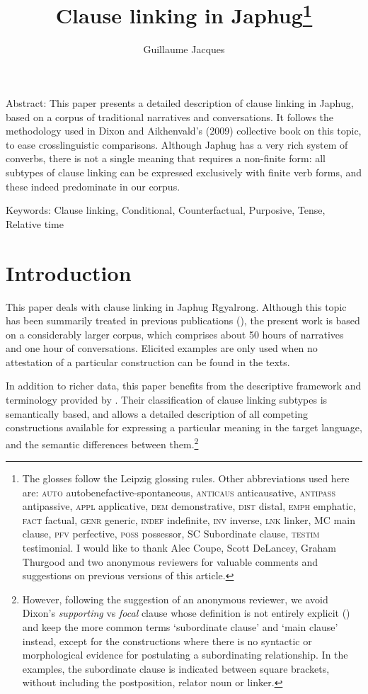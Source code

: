 \documentclass[oldfontcommands,oneside,a4paper,11pt]{article}
\begin{document}
 
\title{Clause linking in Japhug\footnote{
The glosses follow the Leipzig glossing rules. Other abbreviations used here are: \textsc{auto}  autobenefactive-spontaneous, \textsc{anticaus} anticausative, \textsc{antipass} antipassive, \textsc{appl} applicative, \textsc{dem} demonstrative,  \textsc{dist} distal, \textsc{emph} emphatic, \textsc{fact} factual, \textsc{genr} generic, \textsc{indef} indefinite, \textsc{inv} inverse,  \textsc{lnk} linker, MC main clause, \textsc{pfv} perfective, \textsc{poss} possessor,  SC Subordinate clause, \textsc{testim} testimonial. I would like to thank Alec Coupe, Scott DeLancey, Graham Thurgood and two anonymous reviewers for valuable comments and suggestions on previous versions of this article.
} }
\author{Guillaume Jacques}
\maketitle

Abstract: This paper presents a detailed description of clause linking in Japhug, based on a corpus of traditional narratives and conversations. It follows the methodology used in Dixon and Aikhenvald's (2009) collective book on this topic, to ease crosslinguistic comparisons. Although Japhug has a very rich system of converbs, there is not a single meaning that requires a non-finite form: all subtypes of clause linking can be expressed exclusively with finite verb forms, and these indeed predominate in our corpus.

Keywords: Clause linking, Conditional, Counterfactual, Purposive, Tense, Relative time 

\section{Introduction}

This paper  deals with clause linking in Japhug Rgyalrong. Although this topic has been summarily treated in previous publications (\citealt[317-325]{jacques08}), the present work is based on a considerably larger corpus, which comprises about 50 hours of narratives and one hour of conversations. Elicited examples are only used when no attestation of a particular construction can be found in the texts. 

In addition to richer data, this paper  benefits from the descriptive framework and terminology provided by \citet{dixon09clause.linking}. Their classification of clause linking subtypes is semantically based, and allows a detailed description of all competing constructions available for expressing a particular meaning in the target language, and the semantic differences between them.\footnote{However,  following the suggestion of an anonymous reviewer, we avoid  Dixon's   \textit{supporting}   vs \textit{focal} clause whose definition is not entirely explicit (\citealt[2-5]{dixon09intro}) and keep the  more common terms `subordinate clause' and `main clause'  instead, except for the constructions where there is no syntactic or morphological evidence for postulating a subordinating relationship. In the examples, the subordinate clause is indicated between square brackets, without including the postposition, relator noun or linker.}
\end{document}
